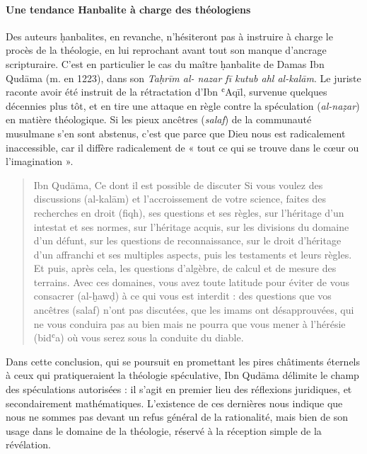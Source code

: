 \paragraph{Une tendance Hanbalite à charge des théologiens}Des auteurs ḥanbalites, en revanche, n'hésiteront pas à instruire à
charge le procès de la théologie, en lui reprochant avant tout son
manque d'ancrage scripturaire. C'est en particulier le cas du maître
ḥanbalite de Damas Ibn Qudāma (m. en 1223), dans son \emph{Taḥrīm al-
nazar fī kutub ahl al-kalām}. Le juriste raconte avoir été instruit de
la rétractation d'Ibn ʿAqīl, survenue quelques décennies plus tôt, et en
tire une attaque en règle contre la spéculation (\emph{al-naẓar}) en
matière théologique. Si les pieux ancêtres (\emph{salaf}) de la
communauté musulmane s'en sont abstenus, c'est que parce que Dieu nous
est radicalement inaccessible, car il diffère radicalement de « tout ce
qui se trouve dans le cœur ou l'imagination ».
\begin{quote}
Ibn Qudāma, Ce dont il est possible de discuter Si vous voulez des discussions (al-kalām) et l’accroissement de votre science, faites des recherches en droit (fiqh), ses questions et ses règles, sur l’héritage d’un intestat et ses normes, sur l’héritage acquis, sur les divisions du domaine d’un défunt, sur les questions de reconnaissance, sur le droit d’héritage d’un affranchi et ses multiples aspects, puis les testaments et leurs règles. Et puis, après cela, les questions d’algèbre, de calcul et de mesure des terrains.  Avec ces domaines, vous avez toute latitude pour éviter de vous consacrer (al-ḫawḍ) à ce qui vous est interdit : des questions que vos ancêtres (salaf) n’ont pas discutées, que les imams ont désapprouvées, qui ne vous conduira pas au bien mais ne pourra que vous mener à l’hérésie (bidʿa) où vous serez sous la conduite du diable.  
\end{quote}
Dans cette conclusion, qui se poursuit en promettant les pires
châtiments éternels à ceux qui pratiqueraient la théologie spéculative,
Ibn Qudāma délimite le champ des spéculations autorisées : il s'agit en
premier lieu des réflexions juridiques, et secondairement mathématiques.
L'existence de ces dernières nous indique que nous ne sommes pas devant
un refus général de la rationalité, mais bien de son usage dans le
domaine de la théologie, réservé à la réception simple de la révélation.

